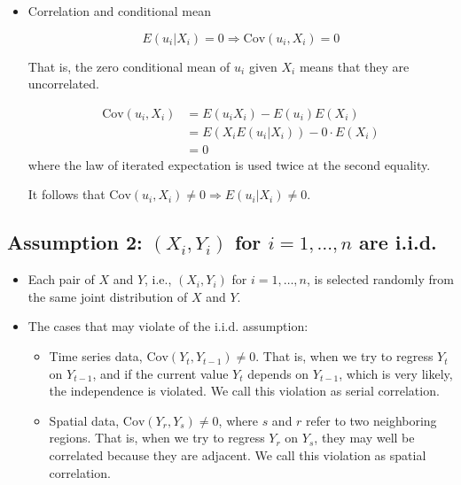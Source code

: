 \documentclass[a4paper,11pt]{article}
\begin{document}
\begin{itemize}
\item Correlation and conditional mean
\label{sec:org7eba55d}

\[ E(u_i | X_i) = 0 \Rightarrow \mathrm{Cov}(u_i, X_i) = 0 \]

That is, the zero conditional mean of \(u_i\) given \(X_i\) means that
they are uncorrelated.

\begin{equation*}
\begin{split}
\mathrm{Cov}(u_i, X_i) &= E(u_i X_i) - E(u_i) E(X_i) \\
&= E(X_i E(u_i|X_i)) - 0 \cdot E(X_i) \\
&= 0
\end{split}
\end{equation*}
where the law of iterated expectation is used twice at the second equality.

It follows that \(\mathrm{Cov}(u_i, X_i) \neq 0 \Rightarrow E(u_i|X_i) \neq 0\).
\end{itemize}


\subsection{Assumption 2: \((X_i, Y_i)\) for \(i = 1, \ldots, n\) are i.i.d.}
\label{sec:orgaf83d0e}

\begin{itemize}
\item Each pair of \(X\) and \(Y\), i.e., \((X_i, Y_i)\) for \(i=1, \ldots, n\), is
selected randomly from the same joint distribution of \(X\) and \(Y\).

\item The cases that may violate of the i.i.d. assumption:
\begin{itemize}
\item Time series data, \(\mathrm{Cov}(Y_t, Y_{t-1}) \neq 0\). That is, when
we try to regress \(Y_t\) on \(Y_{t-1}\), and if the current value
\(Y_t\) depends on \(Y_{t-1}\), which is very likely, the independence
is violated. We call this violation as serial correlation.
\item Spatial data, \(\mathrm{Cov}(Y_r, Y_s) \neq 0\), where \(s\) and \(r\)
refer to two neighboring regions. That is, when we try to regress
\(Y_r\) on \(Y_s\), they may well be correlated because they are
adjacent. We call this violation as spatial correlation.
\end{itemize}
\end{itemize}
\end{document}
